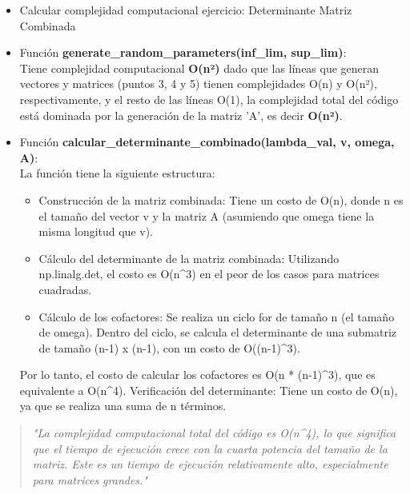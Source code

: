 \documentclass[11pt]{article}
\providecommand{\tightlist}{%
      \setlength{\itemsep}{0pt}\setlength{\parskip}{0pt}}
\begin{document}
    \begin{itemize}
\item
  Calcular complejidad computacional ejercicio: Determinante Matriz
  Combinada
\item
  Función \textbf{generate\_random\_parameters(inf\_lim, sup\_lim)}:\\
  Tiene complejidad computacional \textbf{O(n²)} dado que las líneas que
  generan vectores y matrices (puntos 3, 4 y 5) tienen complejidades
  O(n) y O(n²), respectivamente, y el resto de las líneas O(1), la
  complejidad total del código está dominada por la generación de la
  matriz 'A', es decir \textbf{O(n²)}.
\item
  Función \textbf{calcular\_determinante\_combinado(lambda\_val, v,
  omega, A)}:\\
  La función tiene la siguiente estructura:

  \begin{itemize}
  \tightlist
  \item
    Construcción de la matriz combinada: Tiene un costo de O(n), donde n
    es el tamaño del vector v y la matriz A (asumiendo que omega tiene
    la misma longitud que v).
  \item
    Cálculo del determinante de la matriz combinada: Utilizando
    np.linalg.det, el costo es O(n\^{}3) en el peor de los casos para
    matrices cuadradas.
  \item
    Cálculo de los cofactores: Se realiza un ciclo for de tamaño n (el
    tamaño de omega). Dentro del ciclo, se calcula el determinante de
    una submatriz de tamaño (n-1) x (n-1), con un costo de
    O((n-1)\^{}3).
  \end{itemize}

  Por lo tanto, el costo de calcular los cofactores es O(n *
  (n-1)\^{}3), que es equivalente a O(n\^{}4). Verificación del
  determinante: Tiene un costo de O(n), ya que se realiza una suma de n
  términos.
\end{itemize}

\begin{quote}
\emph{"La complejidad computacional total del código es O(n\^{}4), lo
que significa que el tiempo de ejecución crece con la cuarta potencia
del tamaño de la matriz. Este es un tiempo de ejecución relativamente
alto, especialmente para matrices grandes."}
\end{quote}
\end{document}
